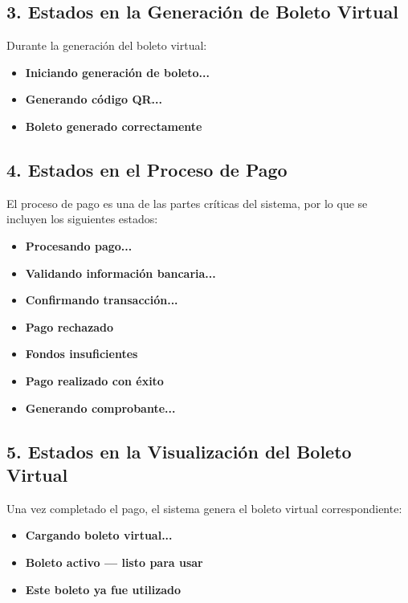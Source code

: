 \documentclass[12pt]{article}
\begin{document}
\subsection{3. Estados en la Generación de Boleto Virtual}

Durante la generación del boleto virtual:

\begin{itemize}
    \item \textbf{Iniciando generación de boleto...}
    \item \textbf{Generando código QR...}
    \item \textbf{Boleto generado correctamente}
\end{itemize}

\subsection{4. Estados en el Proceso de Pago}

El proceso de pago es una de las partes críticas del sistema, por lo que se incluyen los siguientes estados:

\begin{itemize}
    \item \textbf{Procesando pago...}
    \item \textbf{Validando información bancaria...}
    \item \textbf{Confirmando transacción...}
    \item \textbf{Pago rechazado}
    \item \textbf{Fondos insuficientes}
    \item \textbf{Pago realizado con éxito}
    \item \textbf{Generando comprobante...}
\end{itemize}

\subsection{5. Estados en la Visualización del Boleto Virtual}

Una vez completado el pago, el sistema genera el boleto virtual correspondiente:

\begin{itemize}
    \item \textbf{Cargando boleto virtual...}
    \item \textbf{Boleto activo --- listo para usar}
    \item \textbf{Este boleto ya fue utilizado}
\end{itemize}
\end{document}
